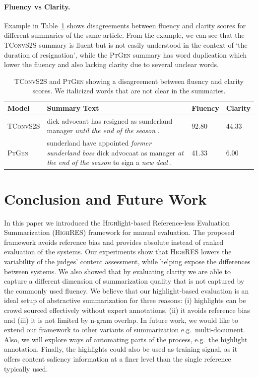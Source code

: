 \documentclass[11pt,a4paper]{article}
\newcommand\highres{\textsc{HighRES}}
\newcommand\ptgen{\textsc{PtGen}}
\newcommand\tconv{\textsc{TConvS2S}}
\begin{document}
\paragraph{Fluency vs Clarity.} Example in Table~\ref{table:fluencyclarityexample} shows disagreements between fluency and clarity scores for different summaries of the same article. From the example, we can see that the \tconv{} summary is fluent but is not easily understood in the context of `the duration of resignation', while the \ptgen{} summary has word duplication which lower the fluency and also lacking clarity due to several unclear words. 
\begin{table}[t!]
\small
\begin{tabular}{p{1.5cm}|p{3.1cm}|p{0.7cm}p{0.7cm}}
\hline
\textbf{Model}     & \textbf{Summary Text}  & \textbf{Fluency} & \textbf{Clarity} \\
\hline
\tconv{}  & dick advocaat has resigned as sunderland manager \textit{until the end of the season} .                                          & 92.80   & 44.33   \\
\ptgen{}     & sunderland have appointed \textit{former sunderland boss} dick advocaat as manager \textit{at the end of the season} to sign a \textit{new deal} . & 41.33   & 6.00    \\
\hline
\end{tabular}
\caption{\tconv{} and \ptgen{} showing a disagreement between fluency and clarity scores. We italicized words that are not clear in the summaries.}
\label{table:fluencyclarityexample}
\end{table}

\section{Conclusion and Future Work}
In this paper we introduced the \textsc{High}light-based \textsc{R}eference-less \textsc{E}valuation \textsc{S}ummarization (\highres) framework for manual evaluation.
The proposed framework avoids reference  bias
and provides absolute instead of ranked evaluation of the systems. Our experiments show that \highres{}  lowers the variability of the judges' content assessment, while helping expose the differences between systems. We also showed that by evaluating clarity we are able to capture a different dimension of summarization quality that is not captured by the commonly used fluency. We believe that our highlight-based evaluation is an ideal setup of abstractive summarization for three reasons: (i) highlights can be crowd sourced effectively without expert annotations, (ii) it avoids reference bias and (iii) it is not limited by n-gram overlap.
In future work, we would like to extend our framework to other variants of summarization e.g.\  multi-document. Also, we will explore ways of automating parts of the process, e.g.\ the highlight annotation. Finally, the highlights could also be used as training signal, as it offers content saliency information at a finer level than the single reference typically used.
\end{document}
